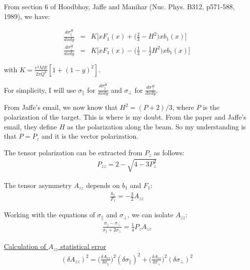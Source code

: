 \documentclass[11pt]{article}
\begin{document}
\newpage




%
\pagestyle{plain}


From section 6 of Hoodbhoy, Jaffe and Manihar (Nuc. Phys. B312, p571-588, 1989), we have:


\begin{eqnarray}
\frac{d\sigma_{\parallel}^H}{dxdy} & = & K \Bigg[x F_1(x) + \Big(\frac{2}{3} - H^2\Big) x b_1(x) \Bigg]\\
\frac{d\sigma_{\perp}^H}{dxdy}    & = & K \Bigg[x F_1(x) - \Big(\frac{1}{3} - \frac{1}{2}H^2\Big) x b_1(x) \Bigg]
\label{xs} 
\end{eqnarray}

with $K = \frac{e^4 M E}{2 \pi Q^4} [1+(1-y)^2]$.

For simplicity, I will use $\sigma_{\parallel}$ for $\frac{d\sigma_{\parallel}^H}{dxdy}$ and $\sigma_{\perp}$ for $\frac{d\sigma_{\perp}^H}{dxdy}$.


From Jaffe's email, we now know that $H^2 = (P+2)/3$, where $P$ is the polarization of the target. This is where is my doubt. From the paper and Jaffe's email, they define $H$ as the polarization along the beam. So my understanding is that $P = P_z$ and it is the vector polarization. 

The tensor polarization can be extracted from $P_z$ as follows:
\begin{eqnarray}
P_{zz} = 2 - \sqrt{4 - 3 P_z^2}
\label{none} 
\end{eqnarray}

The tensor asymmetry $A_{zz}$ depends on $b_1$ and $F_1$:
\begin{eqnarray}
\frac{b_1}{F_1} = - \frac{3}{2} A_{zz}
\label{none} 
\end{eqnarray}


Working with the equations of $\sigma_{\parallel}$ and $\sigma_{\perp}$, we can isolate $A_{zz}$:
\begin{eqnarray}
\frac{\sigma_{\parallel} - \sigma_{\perp}}{\sigma_{\parallel} + 2 \sigma_{\perp}} = \frac{1}{4} P_z A_{zz}
\label{none} 
\end{eqnarray}

\vspace{0.5cm}
\underline{Calculation of $A_{zz}$ statistical error}
\begin{eqnarray}
(\delta A_{zz})^2 = \Bigg( \frac{\delta A_{zz}}{\delta \sigma_{\parallel}} \Bigg)^2 (\delta \sigma_{\parallel})^2 + \Bigg( \frac{\delta A_{zz}}{\delta \sigma_{\perp}} \Bigg)^2 (\delta \sigma_{\perp})^2
\label{none} 
\end{eqnarray}
\end{document}
